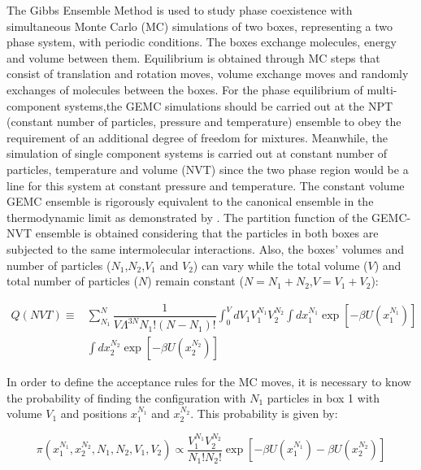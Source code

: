 The Gibbs Ensemble Method \cite{papa1987} is used to study phase coexistence with simultaneous Monte Carlo (MC) simulations of two boxes,  representing a two phase system, with periodic conditions. The boxes exchange molecules, energy and volume between them. Equilibrium is obtained through MC steps that consist of translation and rotation moves, volume exchange moves and randomly exchanges of molecules between the boxes. For the phase equilibrium of multi-component systems,the GEMC simulations should be carried out at the NPT (constant number of particles, pressure and temperature) ensemble to obey the requirement of an additional degree of freedom for mixtures. Meanwhile, the simulation of single component systems is carried out at constant number of particles, temperature and volume (NVT) since the two phase region would be a line for this system at constant pressure and temperature. The constant volume GEMC ensemble is rigorously equivalent to the canonical ensemble in the thermodynamic limit as demonstrated by . The partition function of the GEMC-NVT ensemble is obtained considering that the particles in both boxes are subjected to the same intermolecular interactions. Also, the boxes’ volumes and number of particles ($N_{1}$,$N_{2}$,$V_{1}$ and $V_{2}$) can vary while the total volume ($V$) and total number of particles ($N$) remain constant ($N = N_{1} + N_{2}$,$V = V_{1} + V_{2}$):

\begin{equation}
\begin{aligned}
Q(NVT) {} \equiv & \sum_{N_{1}}^{N} \dfrac{1}{V \Lambda ^{3N} N_{1}!(N-N_{1})!} \int_{0}^{V} dV_{1} V_{1}^{N_{1}} V_{2}^{N_{2}} \int dx_{1}^{N_{1}} \exp[-\beta U(x_{1}^{N_{1}})] \\
& \int dx_{2}^{N_{2}} \exp[-\beta U(x_{2}^{N_{2}})]
\end{aligned}
\label{eqn:gepart}
\end{equation}

In order to define the acceptance rules for the MC moves, it is necessary to know the probability of finding the configuration with $N_{1}$ particles in box 1 with volume $V_{1}$ and positions $x_{1}^{N_{1}}$ and $x_{2}^{N_{2}}$. This probability is given by:

\begin{equation}
\pi(x_{1}^{N_{1}},x_{2}^{N_{2}},N_{1},N_{2},V_{1},V_{2}) \propto \dfrac{V_{1}^{N_{1}}V_{2}^{N_{2}}}{N_{1}!N_{2}!} \exp[-\beta U(x_{1}^{N_{1}}) -\beta U(x_{2}^{N_{2}})]
\label{eqn:geprob}
\end{equation}

